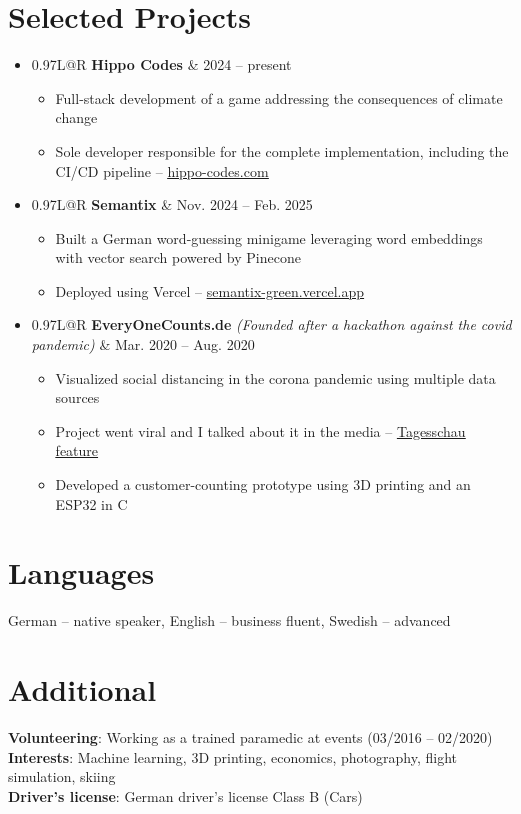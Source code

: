 \documentclass[letterpaper,11pt]{article}
\makeatletter
\newcommand{\resumeItem}[1]{
  \item\small{
    {#1 \vspace{-2pt}}
  }
}
\newcommand{\resumeProjectHeading}[2]{
    \item
    \begin{tabular*}{0.97\textwidth}{L@{\extracolsep{\fill}}R}
      \small#1 & #2 \\
    \end{tabular*}\vspace{-7pt}
}
\newcommand{\resumeSubHeadingListStart}{\begin{itemize}[leftmargin=0.15in, label={}]}
\newcommand{\resumeSubHeadingListEnd}{\end{itemize}}
\newcommand{\resumeItemListStart}{\begin{itemize}[rightmargin=0.17\textwidth]}
\newcommand{\resumeItemListEnd}{\end{itemize}\vspace{-5pt}}
\makeatother
\begin{document}
\section{Selected Projects}
\resumeSubHeadingListStart
      \resumeProjectHeading
          {\textbf{Hippo Codes}}{2024 -- present}
          \resumeItemListStart
            \resumeItem{Full-stack development of a game addressing the consequences of climate change}
            \resumeItem{Sole developer responsible for the complete implementation, including the CI/CD pipeline -- \href{https://hippo-codes.com/}{\underline{hippo-codes.com}}}
          \resumeItemListEnd
      \resumeProjectHeading
          {\textbf{Semantix}}{Nov. 2024 -- Feb. 2025}
          \resumeItemListStart
            \resumeItem{Built a German word-guessing minigame leveraging word embeddings with vector search powered by Pinecone}
            \resumeItem{Deployed using Vercel -- \href{https://semantix-green.vercel.app/login}{\underline{semantix-green.vercel.app}}}
          \resumeItemListEnd
      \resumeProjectHeading
          {\textbf{EveryOneCounts.de} \emph{(Founded after a hackathon against the covid pandemic)}}{Mar. 2020 -- Aug. 2020}
          \resumeItemListStart
            \resumeItem{Visualized social distancing in the corona pandemic using multiple data sources}
            \resumeItem{Project went viral and I talked about it in the media -- \href{https://www.youtube.com/watch?v=donUKy8IGZw}{\underline{Tagesschau feature}}}
            \resumeItem{Developed a customer-counting prototype using 3D printing and an ESP32 in C}
          \resumeItemListEnd
\resumeSubHeadingListEnd



%
\section{Languages}
 \begin{itemize}[leftmargin=0.15in, label={}]
    \small{\item{
     German -- native speaker, English -- business fluent, Swedish -- advanced
    }}
 \end{itemize}


\section{Additional}
 \begin{itemize}[leftmargin=0.15in, label={}]
    \small{\item{
     \textbf{Volunteering}{: Working as a trained paramedic at events (03/2016 -- 02/2020)} \\
     \textbf{Interests}{: Machine learning, 3D printing, economics, photography, flight simulation, skiing} \\
     \textbf{Driver's license}{: German driver's license Class B (Cars)}
    }}
 \end{itemize}


\end{document}
